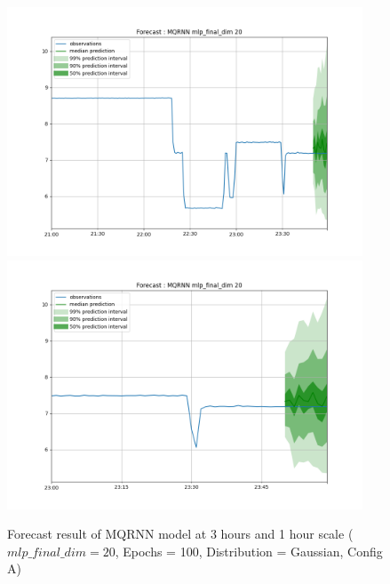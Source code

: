 \documentclass[a4paper, 12pt]{article}
\begin{document}
\begin{figure}[!h]
    \centering
    \includegraphics[width=400px]{plots/forecast/a/MQRNN/mlp_final_dim/20/180.png}
    \includegraphics[width=400px]{plots/forecast/a/MQRNN/mlp_final_dim/20/60.png}
    \caption{Forecast result of MQRNN model at 3 hours and 1 hour scale ($mlp\_final\_dim = 20 $, Epochs = 100, Distribution = Gaussian, Config A)}
    \label{fig:mqrnn}
\end{figure}
\end{document}
